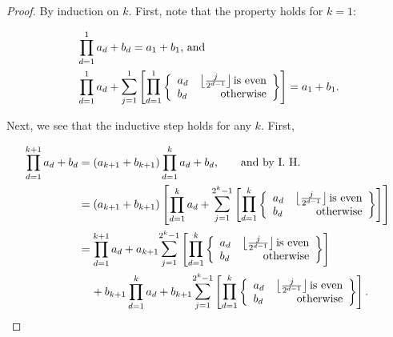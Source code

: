 \documentclass[11pt,a4paper]{tesis}
\theoremstyle{plain}
\theoremstyle{definition}
\begin{document}
\begin{proof}
  By induction on $k$. First, note that the property holds for $k = 1$:

  \begin{equation*}
    \begin{aligned}
      & \prod_{d = 1}^{1} a_d + b_d = a_1 + b_1 \text{, and} \\
      & \prod_{d = 1}^{1} a_d + \mathlarger{\sum}_{j = 1}^{1} \left [ \mathlarger{\prod}_{d = 1}^{1}
      \left \{ \begin{array}{lr}
        a_d & \left\lfloor \frac{j}{2^{d - 1}} \right\rfloor \text{is even} \\
        b_d & \text{otherwise}
      \end{array} \right \} \right ] = a_1 + b_1 \text{.}
    \end{aligned}
  \end{equation*}

  Next, we see that the inductive step holds for any $k$. First,

  \begin{equation*}
    \begin{aligned}
      \prod_{d = 1}^{k + 1} a_d + b_d
        & = (a_{k + 1} + b_{k + 1}) \prod_{d = 1}^{k} a_d + b_d \text{, \hspace*{5mm} and by I. H.} \\
        & = (a_{k + 1} + b_{k + 1}) \left[ \prod_{d = 1}^{k} a_d + \mathlarger{\sum}_{j = 1}^{2^k - 1} \left [ \mathlarger{\prod}_{d = 1}^{k}
      \left \{ \begin{array}{lr}
        a_d & \left\lfloor \frac{j}{2^{d - 1}} \right\rfloor \text{is even} \\
        b_d & \text{otherwise}
      \end{array} \right \} \right ] \right] \\
        & = \prod_{d = 1}^{k + 1} a_d + a_{k + 1} \mathlarger{\sum}_{j = 1}^{2^k - 1} \left [ \mathlarger{\prod}_{d = 1}^{k}
        \left \{ \begin{array}{lr}
          a_d & \left\lfloor \frac{j}{2^{d - 1}} \right\rfloor \text{is even} \\
          b_d & \text{otherwise}
        \end{array} \right \} \right ] \\
        & \hspace*{4mm} + b_{k + 1} \prod_{d = 1}^{k} a_d + b_{k + 1} \mathlarger{\sum}_{j = 1}^{2^k - 1} \left [ \mathlarger{\prod}_{d = 1}^{k}
        \left \{ \begin{array}{lr}
          a_d & \left\lfloor \frac{j}{2^{d - 1}} \right\rfloor \text{is even} \\
          b_d & \text{otherwise}
        \end{array} \right \} \right ] \text{.}
    \end{aligned}
  \end{equation*}


\end{proof}
\end{document}
